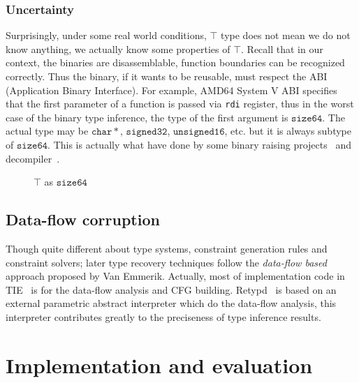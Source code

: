 \documentclass[compsoc,conference,a4paper,10pt,times]{IEEEtran}
\begin{document}
\subsubsection*{Uncertainty}
Surprisingly, under some real world conditions, $\top$ type does not mean we do not know anything,
we actually know some properties of $\top$. Recall that in our context, the binaries are disassemblable, function boundaries can be
recognized correctly.
Thus the binary, if it wants to be reusable, must respect the ABI (Application
Binary Interface). For example, AMD64 System V ABI specifies that the first parameter of
a function is passed via \texttt{rdi} register, thus in the worst case of the binary type
inference, the type of the first argument is $\mathtt{size64}$. The actual type may be
$\mathtt{char*}$, $\mathtt{signed32}$, $\mathtt{unsigned16}$, etc. but it is always
subtype of $\mathtt{size64}$. This is actually what have done by some binary raising
projects~\cite{goodman_lifting_2018,yadavalli_raising_2019} and decompiler~\cite{durfina_detection_2012}.
\begin{figure}[h]
  \centering
  \caption{$\top$ as $\mathtt{size64}$}
\end{figure}

\subsection{Data-flow corruption}
\noindent
Though quite different about type systems, constraint generation rules and constraint solvers;
later type recovery techniques follow the \emph{data-flow based} approach proposed by Van Emmerik.
Actually, most of implementation code in TIE~\cite{lee_tie_2011} is for the data-flow analysis
and CFG building. Retypd~\cite{noonan_polymorphic_2016} is based on an external parametric
abstract interpreter which do the data-flow analysis, this interpreter contributes greatly to the
preciseness of type inference results.

\section{Implementation and evaluation}
\end{document}
